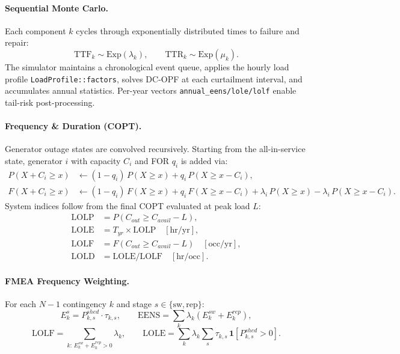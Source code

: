 \paragraph{Sequential Monte Carlo.}
Each component $k$ cycles through exponentially distributed times to failure
and repair:
\begin{equation}
  \mathrm{TTF}_k \sim \mathrm{Exp}(\lambda_k), \qquad
  \mathrm{TTR}_k \sim \mathrm{Exp}(\mu_k).
\end{equation}
The simulator maintains a chronological event queue, applies the hourly load
profile \texttt{LoadProfile::factors}, solves DC-OPF at each curtailment
interval, and accumulates annual statistics.  Per-year vectors
\texttt{annual\_eens/lole/lolf} enable tail-risk post-processing.

\paragraph{Frequency \& Duration (COPT).}
Generator outage states are convolved recursively.  Starting from the
all-in-service state, generator $i$ with capacity $C_i$ and FOR $q_i$ is
added via:
\begin{align}
  P(X + C_i \ge x) &\leftarrow
    (1-q_i)\,P(X \ge x) + q_i\,P(X \ge x - C_i), \\
  F(X + C_i \ge x) &\leftarrow
    (1-q_i)\,F(X \ge x) + q_i\,F(X \ge x - C_i)
    + \lambda_i\,P(X \ge x) - \lambda_i\,P(X \ge x - C_i).
\end{align}
System indices follow from the final COPT evaluated at peak load $L$:
\begin{align}
  \mathrm{LOLP} &= P(C_{out} \ge C_{avail} - L), \\
  \mathrm{LOLE} &= T_{yr} \times \mathrm{LOLP} \quad [\text{hr/yr}], \\
  \mathrm{LOLF} &= F(C_{out} \ge C_{avail} - L) \quad [\text{occ/yr}], \\
  \mathrm{LOLD} &= \mathrm{LOLE} / \mathrm{LOLF} \quad [\text{hr/occ}].
\end{align}

\paragraph{FMEA Frequency Weighting.}
For each $N-1$ contingency $k$ and stage $s \in \{\mathrm{sw}, \mathrm{rep}\}$:
\begin{equation}
  E^s_k = P^{shed}_{k,s} \cdot \tau_{k,s}, \qquad
  \mathrm{EENS} = \sum_k \lambda_k (E^{sw}_k + E^{rep}_k),
\end{equation}
\begin{equation}
  \mathrm{LOLF} = \sum_{k:\, E^{sw}_k + E^{rep}_k > 0} \lambda_k, \qquad
  \mathrm{LOLE} = \sum_k \lambda_k \!\sum_{s} \tau_{k,s}\,\mathbf{1}[P^{shed}_{k,s} > 0].
\end{equation}

